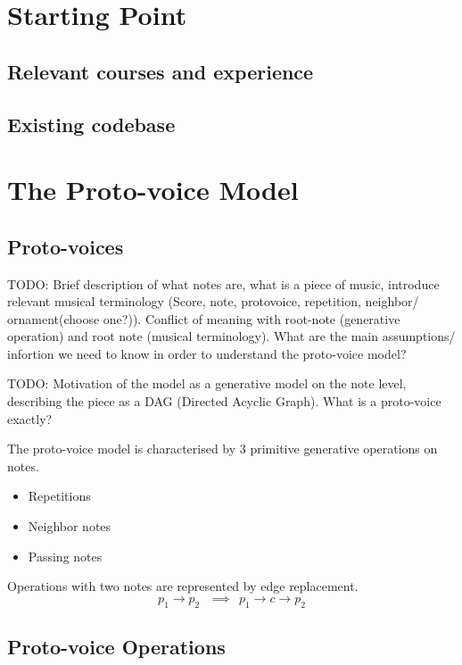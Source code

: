 \documentclass[12pt,a4paper,twoside,openright]{report}
\begin{document}
\section{Starting Point}

\subsection{Relevant courses and experience}

\subsection{Existing codebase}

\section{The Proto-voice Model}

\subsection{Proto-voices}
TODO: Brief description of what notes are, what is a piece of music, introduce relevant musical terminology (Score, note, protovoice, repetition, neighbor/ ornament(choose one?)). Conflict of meaning with root-note (generative operation) and root note (musical terminology). What are the main assumptions/ infortion we need to know in order to understand the proto-voice model?

\par
TODO: Motivation of the model as a generative model on the note level, describing the piece as a DAG (Directed Acyclic Graph). What is a proto-voice exactly? 
\par 

The proto-voice model is characterised by 3 primitive generative operations on notes.

\begin{itemize}
 \item Repetitions 
  \item Neighbor notes 
  \item Passing notes
\end{itemize}

Operations with two notes are represented by edge replacement. 
\[p_1 \to p_2 ~~~\implies~~ p_1 \to c \to p_2 \label{edge replacement}\]

\subsection{Proto-voice Operations}
\end{document}
